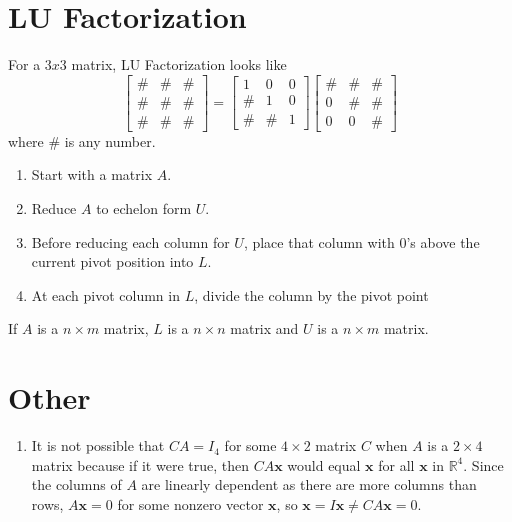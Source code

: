 \documentclass{article}
\begin{document}
\section*{LU Factorization}
For a $3x3$ matrix, LU Factorization looks like
\[\begin{bmatrix}
    \# & \# & \# \\ \# & \# & \# \\ \# & \# & \#
\end{bmatrix}=\begin{bmatrix}
    1 & 0 & 0 \\ \# & 1 & 0 \\ \# & \# & 1
\end{bmatrix}\begin{bmatrix}
    \# & \# & \# \\ 0 & \# & \# \\ 0 & 0 & \#
\end{bmatrix}\] where \# is any number.
\begin{enumerate}
    \item Start with a matrix $A$.
    \item Reduce $A$ to echelon form $U$.
    \item Before reducing each column for $U$, place that column with 0's above the current pivot
    position into $L$.
    \item At each pivot column in $L$, divide the column by the pivot point
\end{enumerate}

If $A$ is a $n\times m$ matrix, $L$ is a $n\times n$ matrix and $U$ is a $n\times m$ matrix.

\section*{Other}
\begin{enumerate}
    \item It is not possible that $CA=I_4$ for some $4\times 2$ matrix $C$ when $A$ is a
    $2\times 4$ matrix because if it were true, then $CA\mathbf{x}$ would equal $\mathbf{x}$ for
    all $\mathbf{x}$ in $\mathbb{R}^4$. Since the columns of $A$ are linearly dependent as there
    are more columns than rows, $A\mathbf{x}=0$ for some nonzero vector $\mathbf{x}$, so
    $\mathbf{x}=I\mathbf{x}\neq CA\mathbf{x}=0$.
\end{enumerate}
\end{document}
